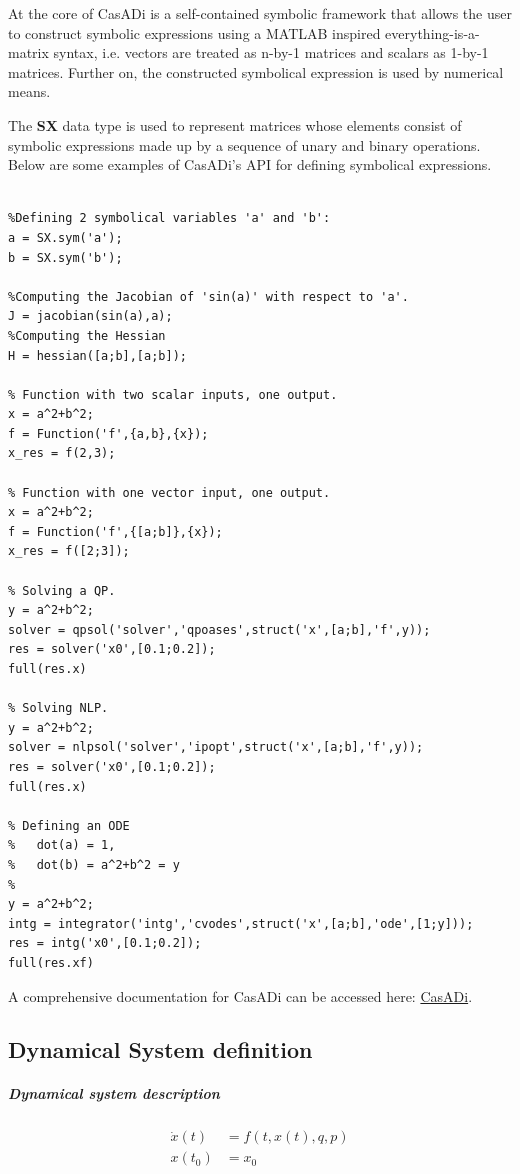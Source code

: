 \documentclass[12pt, letterpaper]{article}
\begin{document}
At the core of CasADi is a self-contained symbolic framework that allows the user to construct symbolic expressions using a MATLAB inspired everything-is-a-matrix syntax, i.e. vectors are treated as n-by-1 matrices and scalars as 1-by-1 matrices. Further on, the constructed symbolical expression is used by numerical means.

The \textbf{SX} data type is used to represent matrices whose elements consist of symbolic expressions made up by a sequence of unary and binary operations.
Below are some examples of CasADi's  API for defining symbolical expressions.

\begin{lstlisting}

%Defining 2 symbolical variables 'a' and 'b':
a = SX.sym('a');
b = SX.sym('b');

%Computing the Jacobian of 'sin(a)' with respect to 'a'.
J = jacobian(sin(a),a);
%Computing the Hessian
H = hessian([a;b],[a;b]);

% Function with two scalar inputs, one output.
x = a^2+b^2;
f = Function('f',{a,b},{x});
x_res = f(2,3);

% Function with one vector input, one output.
x = a^2+b^2;
f = Function('f',{[a;b]},{x});
x_res = f([2;3]);

% Solving a QP.
y = a^2+b^2;
solver = qpsol('solver','qpoases',struct('x',[a;b],'f',y));
res = solver('x0',[0.1;0.2]);
full(res.x)

% Solving NLP.
y = a^2+b^2;
solver = nlpsol('solver','ipopt',struct('x',[a;b],'f',y));
res = solver('x0',[0.1;0.2]);
full(res.x)

% Defining an ODE
%   dot(a) = 1,
%   dot(b) = a^2+b^2 = y
%  
y = a^2+b^2;
intg = integrator('intg','cvodes',struct('x',[a;b],'ode',[1;y]));
res = intg('x0',[0.1;0.2]);
full(res.xf)

\end{lstlisting}

A comprehensive documentation for CasADi can be accessed here: \href{https://web.casadi.org/docs/}{CasADi}.


\subsection{Dynamical System definition}

\subparagraph{Dynamical system description}

\begin{subequations}
\begin{align}
\dot{x}(t) &= f(t, x(t), q, p)   \\
x(t_0) &=x_0
\end{align}
\end{subequations}
\end{document}
